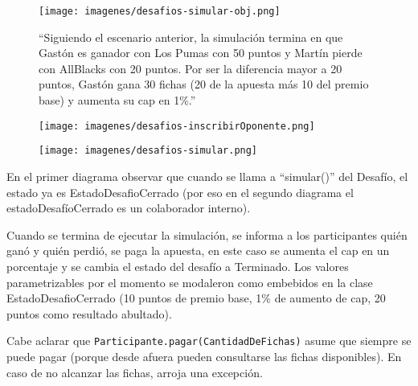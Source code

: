   \begin{figure}[h!]
   \texttt{[image: imagenes/desafios-simular-obj.png]}
   \caption{``Siguiendo el escenario anterior, la simulación termina en que Gastón es ganador con Los Pumas con 50 puntos y Martín pierde con AllBlacks con 20 puntos.
Por ser la diferencia mayor a 20 puntos, Gastón gana 30 fichas (20 de la apuesta más 10 del premio base) y aumenta su cap en 1\%.''}
  \end{figure}

\newpage
\begin{landscape}

  \begin{figure}[h!]
   \texttt{[image: imagenes/desafios-inscribirOponente.png]}
   \caption{}
  \end{figure}

\end{landscape}
\newpage
\begin{landscape}

  \begin{figure}[h!]
   \texttt{[image: imagenes/desafios-simular.png]}
   \caption{}
  \end{figure}

\end{landscape}
\newpage

En el primer diagrama observar que cuando se llama a ``simular()'' del Desafío, el estado ya es EstadoDesafioCerrado (por eso en el segundo diagrama
el estadoDesafíoCerrado es un colaborador interno).

Cuando se termina de ejecutar la simulación, se informa a los participantes quién ganó y quién perdió, se paga la apuesta, en este caso se aumenta
el cap en un porcentaje y se cambia el estado del desafío a Terminado. Los valores parametrizables por el momento se modaleron como embebidos en la
clase EstadoDesafioCerrado (10 puntos de premio base, 1\% de aumento de cap, 20 puntos como resultado abultado).

Cabe aclarar que {\tt Participante.pagar(CantidadDeFichas)} asume que siempre se puede pagar (porque desde afuera pueden consultarse las fichas disponibles).
 En caso de no alcanzar las fichas, arroja una excepción.
